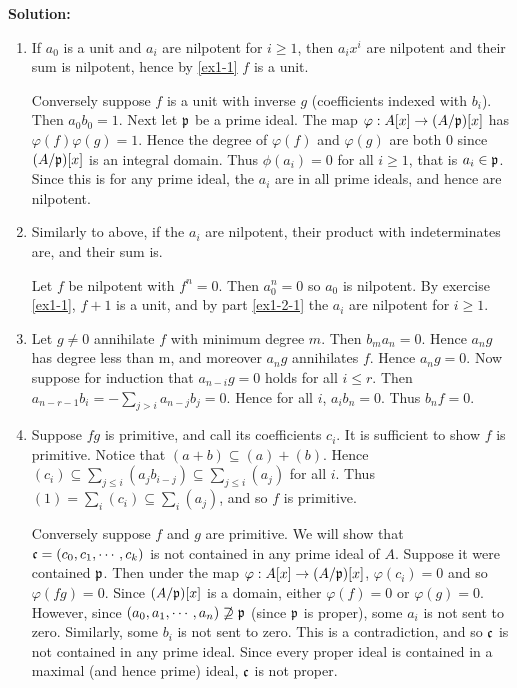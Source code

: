 \documentclass{article}
\begin{document}
\noindent\textbf{Solution:}
\begin{enumerate} \label{ex1-2}
    \item
        If \(a_0\) is a unit and \(a_i\) are nilpotent for \(i \geq 1\), then \(a_i x^i\) are nilpotent and their sum is nilpotent, hence by \ref{ex1-1} \(f\) is a unit.

        Conversely suppose \(f\) is a unit with inverse \(g\) (coefficients indexed with \(b_i\)).
        Then \(a_0 b_0 = 1\).
        Next let \(\mathfrak{p}\) be a prime ideal.
        The map \(\varphi : A[x] \to (A/\mathfrak{p})[x]\) has \(\varphi(f)\varphi(g) = 1\).
        Hence the degree of \(\varphi(f)\) and \(\varphi(g)\) are both \(0\) since \((A/\mathfrak{p})[x]\) is an integral domain.
        Thus \(\phi(a_i) = 0\) for all \(i \geq 1\), that is \(a_i \in \mathfrak{p}\).
        Since this is for any prime ideal, the \(a_i\) are in all prime ideals, and hence are nilpotent.
    \item
        Similarly to above, if the \(a_i\) are nilpotent, their product with indeterminates are, and their sum is.

        Let \(f\) be nilpotent with \(f^n = 0\).
        Then \(a_0^n = 0\) so \(a_0\) is nilpotent.
        By exercise \ref{ex1-1}, \(f + 1\) is a unit, and by part \ref{ex1-2-1} the \(a_i\) are nilpotent for \(i \geq 1\).
    \item
        Let \(g \neq 0\) annihilate \(f\) with minimum degree \(m\).
        Then \(b_m a_n = 0\).
        Hence \(a_n g\) has degree less than m, and moreover \(a_n g\) annihilates \(f\).
        Hence \(a_n g = 0\).
        Now suppose for induction that \(a_{n-i} g = 0\) holds for all \(i \leq r\).
        Then \(a_{n-r-1} b_i = - \sum_{j > i} a_{n-j} b_j = 0\).
        Hence for all \(i\), \(a_i b_n = 0\).
        Thus \(b_n f = 0\).
    \item
        Suppose \(fg\) is primitive, and call its coefficients \(c_i\).
        It is sufficient to show \(f\) is primitive.
        Notice that \((a + b) \subseteq (a) + (b)\).
        Hence \((c_i) \subseteq \sum_{j \leq i} (a_j b_{i-j}) \subseteq \sum_{j \leq i} (a_j)\) for all \(i\).
        Thus \((1) = \sum_i (c_i) \subseteq \sum_i (a_j)\), and so \(f\) is primitive.

        Conversely suppose \(f\) and \(g\) are primitive.
        We will show that \(\mathfrak{c} = (c_0, c_1, \cdots, c_k)\) is not contained in any prime ideal of \(A\).
        Suppose it were contained \(\mathfrak{p}\).
        Then under the map \(\varphi : A[x] \to (A/\mathfrak{p})[x]\), \(\varphi(c_i) = 0\) and so \(\varphi(fg) = 0\).
        Since \((A/\mathfrak{p})[x]\) is a domain, either \(\varphi(f) = 0\) or \(\varphi(g) = 0\).
        However, since \((a_0, a_1, \cdots, a_n) \not\supseteq \mathfrak{p}\) (since \(\mathfrak{p}\) is proper), some \(a_i\) is not sent to zero.
        Similarly, some \(b_i\) is not sent to zero.
        This is a contradiction, and so \(\mathfrak{c}\) is not contained in any prime ideal.
        Since every proper ideal is contained in a maximal (and hence prime) ideal, \(\mathfrak{c}\) is not proper.
\end{enumerate}
\end{document}

